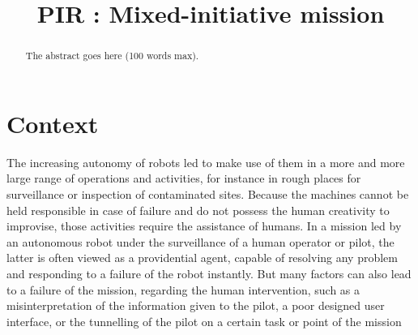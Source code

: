 \documentclass[conference]{IEEEtran}
\begin{document}
%
\title{PIR : Mixed-initiative mission}

% 
	\author{
}




\maketitle

\begin{abstract}
The abstract goes here (100 words max).
\end{abstract}


\IEEEpeerreviewmaketitle

\section{Context}
\label{sec:problem-statement}
The increasing autonomy of robots 
led to make use of them in a more 
and more large range of operations and activities,
for instance in rough places for surveillance or inspection of contaminated sites.
Because the machines cannot be held responsible in case of failure and do not
possess the human creativity to improvise, those activities require the assistance of humans. In
a mission led by an autonomous robot under the surveillance of a human operator or pilot, the
latter is often viewed as a providential agent, capable of resolving any problem and responding
to a failure of the robot instantly. But many factors can also lead to a failure of the mission,
regarding the human intervention, such as a misinterpretation of the information given to the
pilot, a poor designed user interface, or the tunnelling of the pilot on a certain task or point of the mission \cite{LDARGENT2016}
\end{document}
